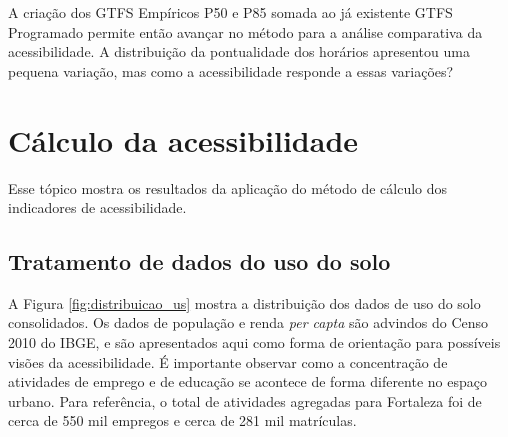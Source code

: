 \documentclass[        
    a4paper,          %
    12pt,             %
    chapter=TITLE,    %
    section=Title,    %
    subsection=Title, %
    oneside,          %
    english,          %
    spanish,          %
    brazil,           %
    fleqn             %
]{abntex2}
\begin{document}
  A criação dos GTFS Empíricos P50 e P85 somada ao já existente GTFS Programado permite então avançar no método para a análise comparativa da acessibilidade. A distribuição da pontualidade dos horários apresentou uma pequena variação, mas como a acessibilidade responde a essas variações?
  
  \hypertarget{calculo-da-acessibilidade-1}{%
  \section{Cálculo da acessibilidade}\label{calculo-da-acessibilidade-1}}
  
  Esse tópico mostra os resultados da aplicação do método de cálculo dos indicadores de acessibilidade.
  
  \hypertarget{tratamento-de-dados-do-uso-do-solo}{%
  \subsection{Tratamento de dados do uso do solo}\label{tratamento-de-dados-do-uso-do-solo}}
  
  A Figura \ref{fig:distribuicao_us} mostra a distribuição dos dados de uso do solo consolidados. Os dados de população e renda \emph{per capta} são advindos do Censo 2010 do IBGE, e são apresentados aqui como forma de orientação para possíveis visões da acessibilidade. É importante observar como a concentração de atividades de emprego e de educação se acontece de forma diferente no espaço urbano. Para referência, o total de atividades agregadas para Fortaleza foi de cerca de 550 mil empregos e cerca de 281 mil matrículas.
  
  \begin{figure}[!h]
  \captionsetup{width=16cm}
  \centering
  \end{figure}
  
\end{document}
